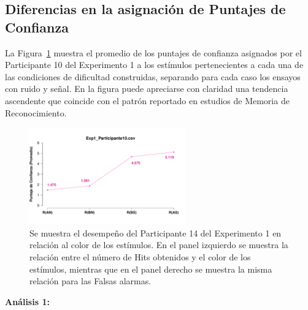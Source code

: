 \subsection{Diferencias en la asignación de Puntajes de Confianza}


La Figura~\ref{fig:MirrorRating_E1_P10} muestra el promedio de los puntajes de confianza asignados por el Participante 10 del Experimento 1 a los estímulos pertenecientes a cada una de las condiciones de dificultad construidas, separando para cada caso los ensayos con ruido y señal. En la figura puede apreciarse con claridad una tendencia ascendente que coincide con el patrón reportado en estudios de Memoria de Reconocimiento.\\

\begin{figure}[th]
\centering
\includegraphics[width=0.60\textwidth]{Figures/MirrorRating_Exp1_P10}
\caption[Comparación entre Puntajes de Confianza asignados por Condición; Ejemplo]{Se muestra el desempeño del Participante 14 del Experimento 1 en relación al color de los estímulos. En el panel izquierdo se muestra la relación entre el número de Hits obtenidos y el color de los estímulos, mientras que en el panel derecho se muestra la misma relación para las Falsas alarmas.}
\label{fig:MirrorRating_E1_P10}
\end{figure}






\textbf{Análisis 1: }

